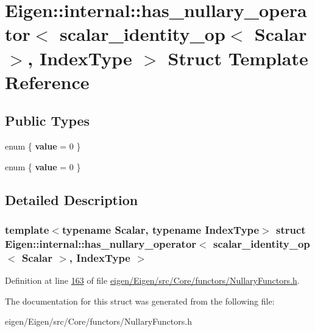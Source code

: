 \hypertarget{struct_eigen_1_1internal_1_1has__nullary__operator_3_01scalar__identity__op_3_01_scalar_01_4_00_01_index_type_01_4}{}\section{Eigen\+:\+:internal\+:\+:has\+\_\+nullary\+\_\+operator$<$ scalar\+\_\+identity\+\_\+op$<$ Scalar $>$, Index\+Type $>$ Struct Template Reference}
\label{struct_eigen_1_1internal_1_1has__nullary__operator_3_01scalar__identity__op_3_01_scalar_01_4_00_01_index_type_01_4}
\subsection*{Public Types}
\begin{DoxyCompactItemize}
\item 
\mbox{\label{struct_eigen_1_1internal_1_1has__nullary__operator_3_01scalar__identity__op_3_01_scalar_01_4_00_01_index_type_01_4_a3cc26a1ea275f9ad5e7ad2c03a9237f8}} 
enum \{ {\bfseries value} = 0
 \}
\item 
\mbox{\label{struct_eigen_1_1internal_1_1has__nullary__operator_3_01scalar__identity__op_3_01_scalar_01_4_00_01_index_type_01_4_abc9b0a62591d2e3a654ccd18fd12a685}} 
enum \{ {\bfseries value} = 0
 \}
\end{DoxyCompactItemize}


\subsection{Detailed Description}
\subsubsection*{template$<$typename Scalar, typename Index\+Type$>$\newline
struct Eigen\+::internal\+::has\+\_\+nullary\+\_\+operator$<$ scalar\+\_\+identity\+\_\+op$<$ Scalar $>$, Index\+Type $>$}



Definition at line \hyperlink{eigen_2_eigen_2src_2_core_2functors_2_nullary_functors_8h_source_l00163}{163} of file \hyperlink{eigen_2_eigen_2src_2_core_2functors_2_nullary_functors_8h_source}{eigen/\+Eigen/src/\+Core/functors/\+Nullary\+Functors.\+h}.



The documentation for this struct was generated from the following file\+:\begin{DoxyCompactItemize}
\item 
eigen/\+Eigen/src/\+Core/functors/\+Nullary\+Functors.\+h\end{DoxyCompactItemize}
